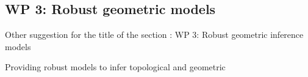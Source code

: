 \subsection*{WP 3:  Robust geometric models} 

Other suggestion for the title of the section : WP 3:  Robust geometric inference models


Providing robust models to infer topological and geometric 